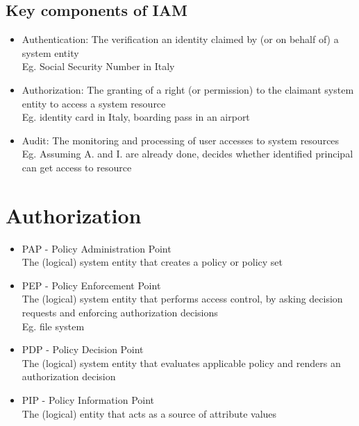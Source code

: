 \documentclass[10pt,a4paper]{book}
\begin{document}
\subsection{Key components of IAM}

\begin{itemize}
\item Authentication: The verification an identity claimed by (or on behalf
of) a system entity\\
Eg. Social Security Number in Italy
\item Authorization: The granting of a right (or permission) to the claimant
system entity to access a system resource\\
Eg. identity card in Italy, boarding pass in an airport
\item Audit: The monitoring and processing of user accesses to
system resources\\
Eg. Assuming A. and I. are already done, decides whether identified principal can get access to resource
\end{itemize}

\section{Authorization}

\begin{itemize}
\item PAP - Policy Administration Point\\
The (logical) system entity that creates a policy or policy set
\item PEP - Policy Enforcement Point\\
The (logical) system entity that performs access control, by asking decision requests and enforcing authorization decisions\\
Eg. file system
\item PDP - Policy Decision Point\\
The (logical) system entity that evaluates applicable policy and renders an authorization decision
\item PIP - Policy Information Point\\
The (logical) entity that acts as a source of attribute values
\end{itemize}
\end{document}
